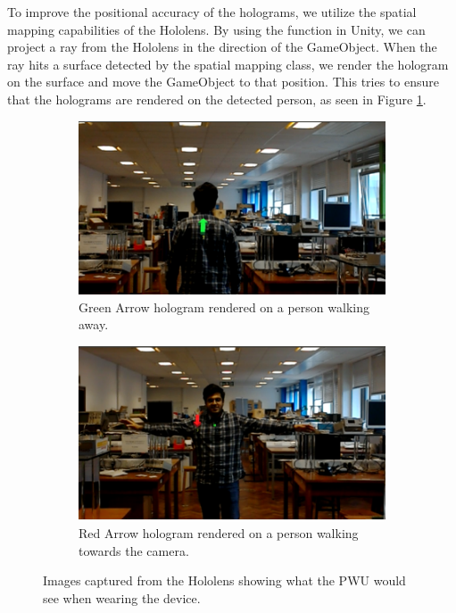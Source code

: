 To improve the positional accuracy of the holograms, we utilize the spatial mapping capabilities of the Hololens. By using the  function in Unity, we can project a ray from the Hololens in the direction of the GameObject. When the ray hits a surface detected by the spatial mapping class, we render the hologram on the surface and move the GameObject to that position. This tries to ensure that the holograms are rendered on the detected person, as seen in Figure \ref{fig:greenredrender}.

\begin{figure}[ht]
    \begin{subfigure}[b]{.45\textwidth}
        \centering
        \includegraphics[width=1.0\linewidth]{img/chapter5_implementation/shreyAway.png}
        \caption{Green Arrow hologram rendered on a person walking away.}
    \end{subfigure}%
    \hspace{\fill} 
    \begin{subfigure}[b]{.45\textwidth}
        \centering
        \includegraphics[width=1.0\linewidth]{img/chapter5_implementation/shreyCome.png}
        \caption{Red Arrow hologram rendered on a person walking towards the camera.}
    \end{subfigure}
    \vspace{-1\baselineskip}
    \begin{center}
        \caption{Images captured from the Hololens showing what the PWU would see when wearing the device.}
        \label{fig:greenredrender}
    \end{center}
    \vspace{-2\baselineskip}
\end{figure}

